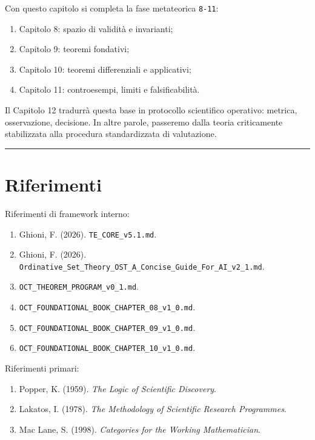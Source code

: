 Con questo capitolo si completa la fase metateorica \texttt{8-11}:

\begin{enumerate}
\def\labelenumi{\arabic{enumi}.}
\tightlist
\item
  Capitolo 8: spazio di validità e invarianti;
\item
  Capitolo 9: teoremi fondativi;
\item
  Capitolo 10: teoremi differenziali e applicativi;
\item
  Capitolo 11: controesempi, limiti e falsificabilità.
\end{enumerate}

Il Capitolo 12 tradurrà questa base in protocollo scientifico operativo: metrica, osservazione, decisione. In altre parole, passeremo dalla teoria criticamente stabilizzata alla procedura standardizzata di valutazione.

\begin{center}\rule{0.5\linewidth}{0.5pt}\end{center}

\section{Riferimenti}

Riferimenti di framework interno:

\begin{enumerate}
\def\labelenumi{\arabic{enumi}.}
\tightlist
\item
  Ghioni, F. (2026). \texttt{TE\_CORE\_v5.1.md}.
\item
  Ghioni, F. (2026). \texttt{Ordinative\_Set\_Theory\_OST\_A\_Concise\_Guide\_For\_AI\_v2\_1.md}.
\item
  \texttt{OCT\_THEOREM\_PROGRAM\_v0\_1.md}.
\item
  \texttt{OCT\_FOUNDATIONAL\_BOOK\_CHAPTER\_08\_v1\_0.md}.
\item
  \texttt{OCT\_FOUNDATIONAL\_BOOK\_CHAPTER\_09\_v1\_0.md}.
\item
  \texttt{OCT\_FOUNDATIONAL\_BOOK\_CHAPTER\_10\_v1\_0.md}.
\end{enumerate}

Riferimenti primari:

\begin{enumerate}
\def\labelenumi{\arabic{enumi}.}
\tightlist
\item
  Popper, K. (1959). \emph{The Logic of Scientific Discovery}.
\item
  Lakatos, I. (1978). \emph{The Methodology of Scientific Research Programmes}.
\item
  Mac Lane, S. (1998). \emph{Categories for the Working Mathematician}.
\end{enumerate}
